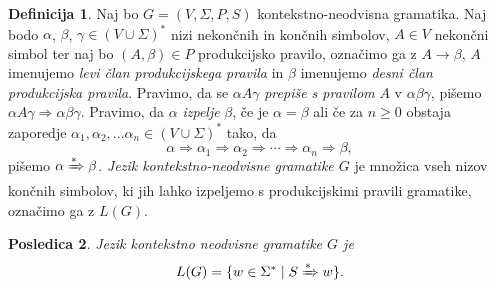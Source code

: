 \documentclass{amsart}
\theoremstyle{definition}
\newtheorem{definicija}{Definicija}[section]
\theoremstyle{plain} %
\newtheorem{posledica}[definicija]{Posledica}
\begin{document}
\begin{definicija}
    
    Naj bo $ G = ( V, \Sigma, P, S ) $ kontekstno-neodvisna gramatika. Naj bodo $ \alpha $,
    $ \beta $, $ \gamma \in ( V \cup \Sigma )^* $ nizi nekončnih in končnih simbolov,
    $ A \in V $ nekončni simbol ter naj bo $ ( A, \beta ) \in P $ produkcijsko pravilo,
    označimo ga z $ A \rightarrow \beta $, $ A $ imenujemo \textit{levi član produkcijskega pravila} in $ \beta $
    imenujemo \textit{desni član produkcijska pravila}. Pravimo, da se $ \alpha A \gamma $ 
    \textit{prepiše s pravilom} $ A $ v $ \alpha\beta\gamma $, pišemo $ \alpha A \gamma  \Rightarrow 
    \alpha\beta\gamma $. Pravimo, da $ \alpha $ \textit{izpelje} $ \beta $, če je $ \alpha = \beta $ ali če
    za $ n \geq 0 $ obstaja zaporedje $ \alpha_1, \alpha_2, \ldots \alpha_n
    \in ( V \cup \Sigma )^* $ tako, da 
    \[
        \alpha \Rightarrow \alpha_1 \Rightarrow \alpha_2 \Rightarrow \cdots \Rightarrow \alpha_n
        \Rightarrow \beta,
    \]
    pišemo $ \alpha \xRightarrow{*} \beta $. \textit{Jezik kontekstno-neodvisne gramatike $G$} je množica vseh nizov končnih simbolov,
    ki jih lahko izpeljemo s produkcijskimi pravili gramatike, označimo ga z $ L(G) $.

\end{definicija}

\begin{posledica}

    Jezik kontekstno neodvisne gramatike $G$ je
    \[
        L(G) = \{ w \in \Sigma^* \mid S \xRightarrow{*} w \}.
    \]

\end{posledica}
\end{document}
